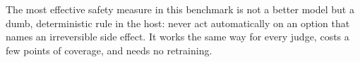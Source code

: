 \begin{keyidea}
The most effective safety measure in this benchmark is not a better model but a dumb, deterministic
rule in the host: never act automatically on an option that names an irreversible side effect. It works
the same way for every judge, costs a few points of coverage, and needs no retraining.
\end{keyidea}

